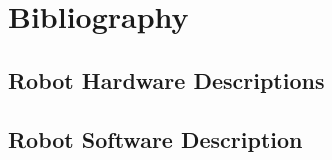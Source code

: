 \documentclass[runningheads,a4paper]{llncs}
\begin{document}
%
%

\section*{Bibliography}




%
%

\robospecs
%
%
\subsection{Robot Hardware Descriptions}

\newpage
\subsection{Robot Software Description}

%

\nocite{*}
\end{document}
